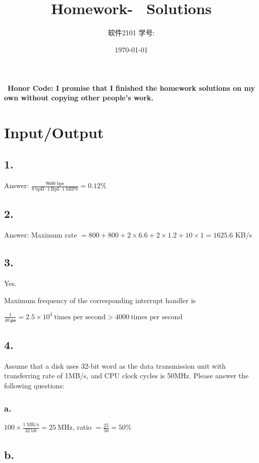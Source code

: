 \documentclass[11pt]{article}  %
\title{\vspace{-4cm}\CourseCodeName \space
        \Session \protect\\  Homework-~\textbf{\Homework} Solutions}
\author{软件2101 \Name \space 学号: \SID}
\date{\today}
\begin{document}
\maketitle

~\textbf{Honor Code: I promise that I finished the homework solutions on my own without copying other people's 
    work.}

\section*{Input/Output}

\subsection*{1. }

Answer: $\displaystyle \frac{9600 ~\text{bps}}{8 ~\text{bpB}\cdot 1~\text{BpI}\cdot 1~\text{MIPS}}=0.12\%$

\subsection*{2. }

Answer: Maximum rate $= 800 + 800 + 2 \times 6.6 + 2 \times 1.2 + 10 \times 1 = 1625.6$ KB/s

\subsection*{3. }
Yes.

Maximum frequency of the corresponding interrupt handler is 

$\displaystyle \frac{1}{40~\mathbf{\mu s}} = 2.5\times 10^4~\text{times per second}> 4000~\text{times per second}$

\subsection*{4. }
Assume that a disk uses 32-bit word as the data transmission unit with transferring rate of 1MB/s, and CPU clock cycles is 50MHz. Please answer the following questions:
 
\subsubsection*{a. }

$100\times \frac{1~\text{MB/s}}{32~\text{bit}}  = 25~\text{MHz}$, ratio $= \frac{25}{50} = 50\%$

\subsection*{b. }
\end{document}

